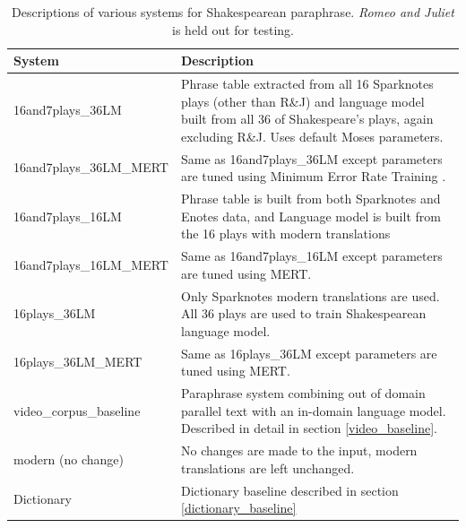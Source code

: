 \documentclass[10pt,a5paper,twoside]{article}
\begin{document}
\begin{table}
  \begin{center}
    \begin{tabular}{|l|p{3in}|}
      \hline
      System & Description \\
      \hline
      \hline
      16and7plays\_36LM & Phrase table extracted from all 16 Sparknotes plays (other than R\&J) and language model built from all 36 of Shakespeare's plays, again excluding R\&J.
      Uses default Moses parameters. \\
      \hline
      16and7plays\_36LM\_MERT & Same as 16and7plays\_36LM except parameters are tuned using Minimum Error Rate Training \cite{MERT}. \\
      \hline
      16and7plays\_16LM & Phrase table is built from both Sparknotes and Enotes data, and Language model is built from the 16 plays with modern translations\\
      \hline
      16and7plays\_16LM\_MERT & Same as 16and7plays\_16LM except parameters are tuned using MERT. \\
      \hline
      16plays\_36LM & Only Sparknotes modern translations are used.  All 36 plays are used to train Shakespearean language model.\\
      \hline
      16plays\_36LM\_MERT & Same as 16plays\_36LM except parameters are tuned using MERT. \\
      \hline
      video\_corpus\_baseline & Paraphrase system combining out of domain parallel text \cite{chen11} with an in-domain language model.  Described
      in detail in section \ref{video_baseline}. \\
      \hline
      modern (no change) & No changes are made to the input, modern translations are left unchanged. \\
      \hline
      Dictionary & Dictionary baseline described in section \ref{dictionary_baseline}\\
      \hline
    \end{tabular}
  \end{center}
  \caption{Descriptions of various systems for Shakespearean paraphrase.  {\em Romeo and Juliet} is held out for testing.}
  \label{systems}
\end{table}
\end{document}
